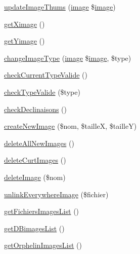 \begin{DoxyCompactItemize}
\item 
\hyperlink{class_acme_group_1_1services_1_1aetools_1_1image_aetools_ab6c3f1d75afbdda38fa0a55c841b10f2}{update\+Image\+Thums} (\hyperlink{class_acme_group_1_1_labo_bundle_1_1_entity_1_1image}{image} \$\hyperlink{class_acme_group_1_1_labo_bundle_1_1_entity_1_1image}{image})
\item 
\hyperlink{class_acme_group_1_1services_1_1aetools_1_1image_aetools_aa6b2d67b997a6baf59d7463ac12d91f1}{get\+Ximage} ()
\item 
\hyperlink{class_acme_group_1_1services_1_1aetools_1_1image_aetools_a041740350004e75164c65d7068a7aa5a}{get\+Yimage} ()
\item 
\hyperlink{class_acme_group_1_1services_1_1aetools_1_1image_aetools_a78c62cc76dbb89f8b2dcec45467e7b25}{change\+Image\+Type} (\hyperlink{class_acme_group_1_1_labo_bundle_1_1_entity_1_1image}{image} \$\hyperlink{class_acme_group_1_1_labo_bundle_1_1_entity_1_1image}{image}, \$type)
\item 
\hyperlink{class_acme_group_1_1services_1_1aetools_1_1image_aetools_a8d350a861963b68e5255088f164271c3}{check\+Current\+Type\+Valide} ()
\item 
\hyperlink{class_acme_group_1_1services_1_1aetools_1_1image_aetools_a3de2961f8f88339afa0db059000560ec}{check\+Type\+Valide} (\$type)
\item 
\hyperlink{class_acme_group_1_1services_1_1aetools_1_1image_aetools_aa82c91ae2f8c4956bbc09f37449355b6}{check\+Declinaisons} ()
\item 
\hyperlink{class_acme_group_1_1services_1_1aetools_1_1image_aetools_a94c5ac400482f628ff05c9ac526d68a5}{create\+New\+Image} (\$nom, \$taille\+X, \$taille\+Y)
\item 
\hyperlink{class_acme_group_1_1services_1_1aetools_1_1image_aetools_aefe5262493995f34ca7179b958004841}{delete\+All\+New\+Images} ()
\item 
\hyperlink{class_acme_group_1_1services_1_1aetools_1_1image_aetools_a25435f7107b8bf46723c1407c68803d3}{delete\+Curt\+Images} ()
\item 
\hyperlink{class_acme_group_1_1services_1_1aetools_1_1image_aetools_ada38b4016b544980f2a8d45351ea542a}{delete\+Image} (\$nom)
\item 
\hyperlink{class_acme_group_1_1services_1_1aetools_1_1image_aetools_ae5bbcbaf85227e5d055b64969906c07f}{unlink\+Everywhere\+Image} (\$fichier)
\item 
\hyperlink{class_acme_group_1_1services_1_1aetools_1_1image_aetools_ad786a0e843fc19362c76805ebba63861}{get\+Fichiers\+Images\+List} ()
\item 
\hyperlink{class_acme_group_1_1services_1_1aetools_1_1image_aetools_a49e5e1688203208c89f999773c3b8edc}{get\+D\+Bimages\+List} ()
\item 
\hyperlink{class_acme_group_1_1services_1_1aetools_1_1image_aetools_a46d540247212abb934f9f332374ea665}{get\+Orphelin\+Images\+List} ()
\end{DoxyCompactItemize}
